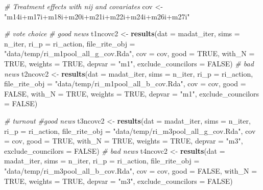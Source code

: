 \documentclass[]{article}
\newenvironment{Shaded}{\begin{snugshade}}{\end{snugshade}}
\newcommand{\KeywordTok}[1]{\textcolor[rgb]{0.13,0.29,0.53}{\textbf{#1}}}
\newcommand{\DataTypeTok}[1]{\textcolor[rgb]{0.13,0.29,0.53}{#1}}
\newcommand{\StringTok}[1]{\textcolor[rgb]{0.31,0.60,0.02}{#1}}
\newcommand{\CommentTok}[1]{\textcolor[rgb]{0.56,0.35,0.01}{\textit{#1}}}
\newcommand{\OtherTok}[1]{\textcolor[rgb]{0.56,0.35,0.01}{#1}}
\newcommand{\NormalTok}[1]{#1}
\begin{document}
\begin{Shaded}
\begin{Highlighting}[]
\CommentTok{# Treatment effects with nij and covariates}
\NormalTok{cov <-}\StringTok{ "m14i+m17i+m18i+m20i+m21i+m22i+m24i+m26i+m27i"}

\CommentTok{# vote choice}
\CommentTok{# good news}
\NormalTok{t1ncovc2 <-}\StringTok{ }\KeywordTok{results}\NormalTok{(}\DataTypeTok{dat =}\NormalTok{ madat_iter, }\DataTypeTok{sims =}\NormalTok{ n_iter, }\DataTypeTok{ri_p =}\NormalTok{ ri_action,}
                    \DataTypeTok{file_rite_obj =} \StringTok{"data/temp/ri_m1pool_all_g_cov.Rda"}\NormalTok{,}
                    \DataTypeTok{cov =}\NormalTok{ cov, }\DataTypeTok{good =} \OtherTok{TRUE}\NormalTok{, }\DataTypeTok{with_N =} \OtherTok{TRUE}\NormalTok{, }\DataTypeTok{weights =} \OtherTok{TRUE}\NormalTok{, }\DataTypeTok{depvar =} \StringTok{"m1"}\NormalTok{, }\DataTypeTok{exclude_councilors =} \OtherTok{FALSE}\NormalTok{)}
\CommentTok{# bad news}
\NormalTok{t2ncovc2 <-}\StringTok{ }\KeywordTok{results}\NormalTok{(}\DataTypeTok{dat =}\NormalTok{ madat_iter, }\DataTypeTok{sims =}\NormalTok{ n_iter, }\DataTypeTok{ri_p =}\NormalTok{ ri_action,}
                    \DataTypeTok{file_rite_obj =} \StringTok{"data/temp/ri_m1pool_all_b_cov.Rda"}\NormalTok{,}
                    \DataTypeTok{cov =}\NormalTok{ cov, }\DataTypeTok{good =} \OtherTok{FALSE}\NormalTok{, }\DataTypeTok{with_N =} \OtherTok{TRUE}\NormalTok{, }\DataTypeTok{weights =} \OtherTok{TRUE}\NormalTok{, }\DataTypeTok{depvar =} \StringTok{"m1"}\NormalTok{, }\DataTypeTok{exclude_councilors =} \OtherTok{FALSE}\NormalTok{)}

\CommentTok{# turnout}
\CommentTok{#good news}
\NormalTok{t3ncovc2 <-}\StringTok{ }\KeywordTok{results}\NormalTok{(}\DataTypeTok{dat =}\NormalTok{ madat_iter, }\DataTypeTok{sims =}\NormalTok{ n_iter, }\DataTypeTok{ri_p =}\NormalTok{ ri_action,}
                    \DataTypeTok{file_rite_obj =} \StringTok{"data/temp/ri_m3pool_all_g_cov.Rda"}\NormalTok{,}
                    \DataTypeTok{cov =}\NormalTok{ cov, }\DataTypeTok{good =} \OtherTok{TRUE}\NormalTok{, }\DataTypeTok{with_N =} \OtherTok{TRUE}\NormalTok{, }\DataTypeTok{weights =} \OtherTok{TRUE}\NormalTok{, }\DataTypeTok{depvar =} \StringTok{"m3"}\NormalTok{, }\DataTypeTok{exclude_councilors =} \OtherTok{FALSE}\NormalTok{)}
\CommentTok{# bad news}
\NormalTok{t4ncovc2 <-}\StringTok{ }\KeywordTok{results}\NormalTok{(}\DataTypeTok{dat =}\NormalTok{ madat_iter, }\DataTypeTok{sims =}\NormalTok{ n_iter, }\DataTypeTok{ri_p =}\NormalTok{ ri_action, }
                    \DataTypeTok{file_rite_obj =} \StringTok{"data/temp/ri_m3pool_all_b_cov.Rda"}\NormalTok{,}
                    \DataTypeTok{cov =}\NormalTok{ cov, }\DataTypeTok{good =} \OtherTok{FALSE}\NormalTok{, }\DataTypeTok{with_N =} \OtherTok{TRUE}\NormalTok{, }\DataTypeTok{weights =} \OtherTok{TRUE}\NormalTok{, }\DataTypeTok{depvar =} \StringTok{"m3"}\NormalTok{, }\DataTypeTok{exclude_councilors =} \OtherTok{FALSE}\NormalTok{)}


\end{Highlighting}
\end{Shaded}
\end{document}
